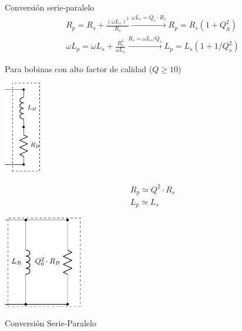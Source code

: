 {Conversión serie-paralelo}
\[
  \begin{array}{l}
      R_p = R_s + \frac{(\omega L_s)^2}{R_s} \xrightarrow{\omega L_s= Q_s \cdot R_s} \boxed{R_p = R_s ( 1 + Q_S^2)}\\
      \omega L_p = \omega L_s + \frac{R_s^2}{\omega L_s} \xrightarrow{R_s = \omega L_s/Q_s} \boxed{L_p = L_s (1 + 1/Q_s^2)}
  \end{array}
\]

Para bobinas con alto factor de calidad (\(Q \geq 10\))

\begin{center}
\includegraphics[height=4cm]{../figs/BobinaReal2.pdf}
\end{center}

\[
\boxed{
\begin{array}{l}
  R_p \simeq Q^2 \cdot R_s\\
  L_p \simeq L_s
\end{array}}
\]


\begin{center}
\includegraphics[height=4cm]{../figs/RL_paralelo.pdf}
\end{center}

{Conversión Serie-Paralelo}

